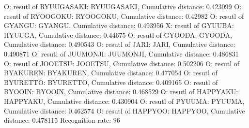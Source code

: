 O: resutl of RYUUGASAKI: RYUUGASAKI, Cumulative distance: 0.423099
O: resutl of RYOOGOKU: RYOOGOKU, Cumulative distance: 0.42982
O: resutl of GYANGU: GYANGU, Cumulative distance: 0.493956
X: resutl of GYUUBA: HYUUGA, Cumulative distance: 0.44675
O: resutl of GYOODA: GYOODA, Cumulative distance: 0.490543
O: resutl of JARI: JARI, Cumulative distance: 0.490871
O: resutl of JUUMONJI: JUUMONJI, Cumulative distance: 0.486831
O: resutl of JOOETSU: JOOETSU, Cumulative distance: 0.502206
O: resutl of BYAKUREN: BYAKUREN, Cumulative distance: 0.477054
O: resutl of BYURETTO: BYURETTO, Cumulative distance: 0.409165
O: resutl of BYOOIN: BYOOIN, Cumulative distance: 0.468529
O: resutl of HAPPYAKU: HAPPYAKU, Cumulative distance: 0.430904
O: resutl of PYUUMA: PYUUMA, Cumulative distance: 0.462574
O: resutl of HAPPYOO: HAPPYOO, Cumulative distance: 0.478115
Recognition rate: 96%
